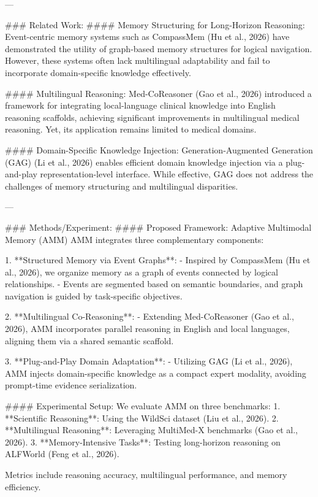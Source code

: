 ---

### Related Work:
#### Memory Structuring for Long-Horizon Reasoning:
Event-centric memory systems such as CompassMem (Hu et al., 2026) have demonstrated the utility of graph-based memory structures for logical navigation. However, these systems often lack multilingual adaptability and fail to incorporate domain-specific knowledge effectively.

#### Multilingual Reasoning:
Med-CoReasoner (Gao et al., 2026) introduced a framework for integrating local-language clinical knowledge into English reasoning scaffolds, achieving significant improvements in multilingual medical reasoning. Yet, its application remains limited to medical domains.

#### Domain-Specific Knowledge Injection:
Generation-Augmented Generation (GAG) (Li et al., 2026) enables efficient domain knowledge injection via a plug-and-play representation-level interface. While effective, GAG does not address the challenges of memory structuring and multilingual disparities.

---

### Methods/Experiment:
#### Proposed Framework: Adaptive Multimodal Memory (AMM)
AMM integrates three complementary components:

1. **Structured Memory via Event Graphs**:
   - Inspired by CompassMem (Hu et al., 2026), we organize memory as a graph of events connected by logical relationships.
   - Events are segmented based on semantic boundaries, and graph navigation is guided by task-specific objectives.

2. **Multilingual Co-Reasoning**:
   - Extending Med-CoReasoner (Gao et al., 2026), AMM incorporates parallel reasoning in English and local languages, aligning them via a shared semantic scaffold.

3. **Plug-and-Play Domain Adaptation**:
   - Utilizing GAG (Li et al., 2026), AMM injects domain-specific knowledge as a compact expert modality, avoiding prompt-time evidence serialization.

#### Experimental Setup:
We evaluate AMM on three benchmarks:
1. **Scientific Reasoning**: Using the WildSci dataset (Liu et al., 2026).
2. **Multilingual Reasoning**: Leveraging MultiMed-X benchmarks (Gao et al., 2026).
3. **Memory-Intensive Tasks**: Testing long-horizon reasoning on ALFWorld (Feng et al., 2026).

Metrics include reasoning accuracy, multilingual performance, and memory efficiency.

